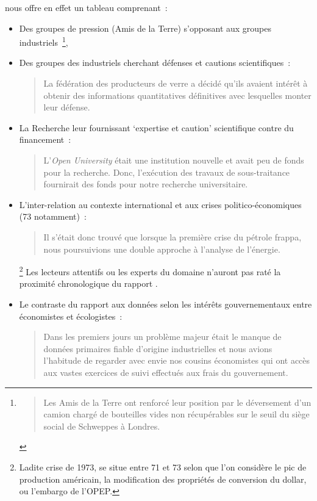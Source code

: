 \citeauthor{boustead_lca_1996} nous offre en effet un tableau comprenant~:
\begin{itemize}
\item Des groupes de pression (Amis de la Terre) s'opposant aux groupes industriels~\footnote{
\blockcquote[traduction]{boustead_lca_1996}{
Les Amis de la Terre ont renforcé leur position par le déversement d'un camion chargé de bouteilles vides non récupérables sur le seuil du siège social de Schweppes à Londres.
}
},
\item Des groupes des industriels cherchant défenses et cautions scientifiques~:
\blockcquote[traduction]{boustead_lca_1996}{
La fédération des producteurs de verre a décidé qu'ils avaient intérêt à obtenir des informations quantitatives définitives avec lesquelles monter leur défense.
}
\item La Recherche leur fournissant `expertise et caution' scientifique contre du financement~:
\blockcquote[traduction]{boustead_lca_1996}{
L'\textit{Open University} était une institution nouvelle et avait peu de fonds pour la recherche.
Donc, l'exécution des travaux de sous-traitance fournirait des fonds pour notre recherche universitaire.
}
\item L'inter-relation au contexte international et aux crises politico-économiques (73 notamment)~:
\blockcquote[traduction]{boustead_lca_1996}{
Il s'était donc trouvé que lorsque la première crise du pétrole frappa, nous poursuivions une double approche à l'analyse de l'énergie.
}
\footnote{Ladite crise de 1973, se situe entre 71 et 73 selon que l'on considère le pic de production américain, la modification des propriétés de conversion du dollar, ou l'embargo de l'OPEP.}
Les lecteurs attentifs ou les experts du domaine n'auront pas raté la proximité chronologique du rapport .
\item Le contraste du rapport aux données selon les intérêts gouvernementaux entre économistes et écologistes~:
\blockcquote[traduction]{boustead_lca_1996}{
Dans les premiers jours un problème majeur était le manque de données primaires fiable d'origine industrielles et nous avions l'habitude de regarder avec envie nos cousins économistes qui ont accès aux vastes exercices de suivi effectués aux frais du gouvernement.
}
\end{itemize}
